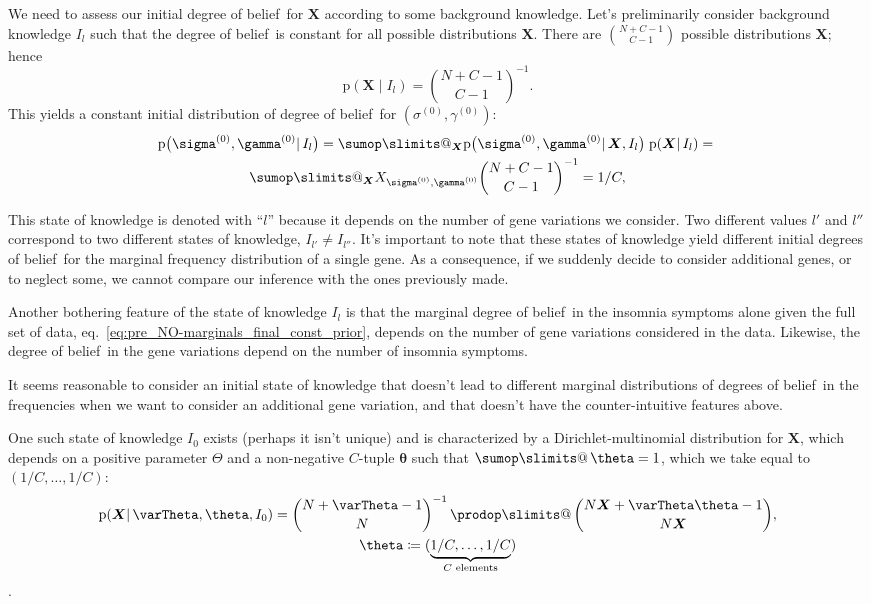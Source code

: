 \documentclass[\ifafour a4paper,12pt,\else a5paper,10pt,\fi%
onecolumn,oneside,article,%
british%
]{memoir}
\makeatletter
\theoremstyle{remark}
\theoremstyle{innote}
\def\sum{\DOTSI\sumop\slimits@}
\def\prod{\DOTSI\prodop\slimits@}
\newcommand*{\citep}{\parencites}
\newcommand*{\defd}{\coloneqq}
\newcommand*{\pf}{\mathrm{p}}%
\renewcommand*{\|}{\mathpunct{|}}
\newcommand*{\sect}{\S}%
\newcommand*{\sects}{\S\S}%
\newcommand*{\eqn}{eq.}%
\newcommand*{\tprod}{\mathop{\textstyle\prod}\nolimits}
\newcommand*{\tsum}{\mathop{\textstyle\sum}\nolimits}
\newcommand*{\puzzle}{\maltese}
\newcommand{\mynote}[1]{ {\color{notecolour}\puzzle\ #1}}
\newcommand*{\dob}{degree of belief}
\newcommand*{\dobs}{degrees of belief}
\newcommand*{\yI}{I}
\newcommand*{\ysum}{\tsum}
\newcommand*{\yprod}{\tprod}
\newcommand*{\ys}{\sigma}
\newcommand*{\yg}{\gamma}
\newcommand*{\gn}{l}
\newcommand*{\ysi}[1]{\ys^{(#1)}}
\newcommand*{\ygi}[1]{\yg^{(#1)}}
\newcommand*{\yso}{\ysi{0}}
\newcommand*{\ygo}{\ygi{0}}
\newcommand*{\yF}{\bm{X}}
\newcommand*{\yIc}{I_{\gn}}
\newcommand*{\yIo}{I_{0}}
\newcommand*{\yA}{\varTheta}
\newcommand*{\ya}{\bm{\theta}}
\makeatother
\begin{document}

We need to assess our initial \dob\ for $\yF$ according to some
background knowledge. Let's preliminarily consider background
knowledge $\yIc$ such that the \dob\ is constant for all possible
distributions $\yF$. There are $\binom{N+C-1}{C-1}$ possible distributions
$\yF$; hence
\begin{equation}
  \label{eq:pre_NO-constant_prior}
  \pf(\yF \| \yIc) = \binom{N+C-1}{C-1}^{-1}.
\end{equation}
This yields a constant  initial  distribution of \dob\ for $(\yso,\ygo)$:
\begin{multline}
  \label{eq:pre_NO-joint_prob_initial_F_unknown}
  \pf\bigl(\yso, \ygo \| \yIc\bigr)  =
  \sum_{\yF}  \pf\bigl(\yso, \ygo \| \yF,\yIc\bigr) \;
  \pf( \yF \| \yIc) ={}\\
  \sum_{\yF}  X_{\yso, \ygo} \binom{N+C-1}{C-1}^{-1}
  = 1/C,
\end{multline}

This state of knowledge is denoted with \enquote{$\gn$} because it depends
on the number of gene variations we consider. Two different values $\gn'$
and $\gn''$ correspond to two different states of knowledge,
$\yI_{\gn'} \ne \yI_{\gn''}$. It's important to note that these states of
knowledge yield different initial \dobs\ for the marginal frequency
distribution of a single gene. As a consequence, if we suddenly decide to
consider additional genes, or to neglect some, we cannot compare our
inference with the ones previously made.

Another bothering feature of the state of knowledge $\yIc$ is that the
marginal \dob\ in the insomnia symptoms alone given the full set of
data, \eqn~\eqref{eq:pre_NO-marginals_final_const_prior}, depends on the number of
gene variations considered in the data. Likewise, the \dob\ in the
gene variations depend on the number of insomnia symptoms.

It seems reasonable to consider an initial state of knowledge that doesn't
lead to different marginal distributions of \dobs\ in the frequencies when
we want to consider an additional gene variation, and that doesn't have
the counter-intuitive features above.

One such state of knowledge $\yIo$ exists (perhaps it isn't unique) and is
characterized by a Dirichlet-multinomial distribution for $\yF$, which
depends on a positive parameter $\yA$ and a non-negative $C$-tuple $\ya$
such that $\ysum\ya=1$, which we take equal to $(1/C,\dotsc,1/C)$:
\begin{multline}
  \label{eq:pre_NO-dirichlet_prior}
  \pf(\yF \| \yA, \ya,\yIo) =
  \binom{N+\yA-1}{N}^{-1} \yprod\binom{N\yF+\yA\ya-1}{N\yF},\\
  \ya \defd (\underbrace{1/C,\dotsc,1/C}_{\text{$C$ elements}})
\end{multline}
\citep[\sect~13.1]{johnsonetal1969_r1996}[\sect~3]{minka2000_r2012}[and
especially][\sects~3--4]{basuetal1982}.
\end{document}
